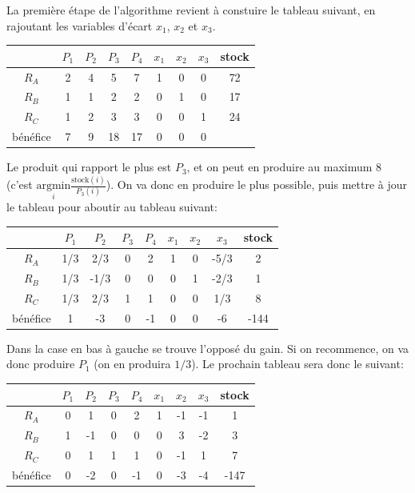       La première étape de l'algorithme revient à constuire le tableau suivant,
      en rajoutant les variables d'écart $x_1$, $x_2$ et $x_3$.

      \begin{center}
        \begin{tabular}{|c|ccccccc|c|}\hline
          & $P_1$ & $P_2$ & $P_3$ & $P_4$ & $x_1$ & $x_2$ & $x_3$ & stock \\ \hline
          $R_A$ & 2 & 4 & 5 & 7 & 1 & 0 & 0 & 72 \\
          $R_B$ & 1 & 1 & 2 & 2 & 0 & 1 & 0 & 17 \\
          $R_C$ & 1 & 2 & 3 & 3 & 0 & 0 & 1 & 24 \\ \hline
          bénéfice & 7 & 9 & 18 & 17 & 0 & 0 & 0 & \\ \hline
        \end{tabular}
      \end{center}

      Le produit qui rapport le plus est $P_3$, et on peut en produire au
      maximum 8 (c'est $\underset{i}{\text{argmin}}
      \frac{\text{stock}(i)}{P_3(i)}$). On va donc en produire le plus
      possible, puis mettre à jour le tableau pour aboutir au tableau suivant:

      \begin{center}
        \begin{tabular}{|c|ccccccc|c|}\hline
          & $P_1$ & $P_2$ & $P_3$ & $P_4$ & $x_1$ & $x_2$ & $x_3$ & stock \\ \hline
          $R_A$ & 1/3 & 2/3 & 0 & 2 & 1 & 0 & -5/3 & 2 \\
          $R_B$ & 1/3 & -1/3 & 0 & 0 & 0 & 1 & -2/3 & 1 \\
          $R_C$ & 1/3 & 2/3 & 1 & 1 & 0 & 0 & 1/3 & 8 \\ \hline
          bénéfice & 1 & -3 & 0 & -1 & 0 & 0 & -6 & -144 \\ \hline
        \end{tabular}
      \end{center}

      Dans la case en bas à gauche se trouve l'opposé du gain. Si on
      recommence, on va donc produire $P_1$ (on en produira $1/3$). Le prochain
      tableau sera donc le suivant:

      \begin{center}
        \begin{tabular}{|c|ccccccc|c|}\hline
          & $P_1$ & $P_2$ & $P_3$ & $P_4$ & $x_1$ & $x_2$ & $x_3$ & stock \\ \hline
          $R_A$ & 0 & 1 & 0 & 2 & 1 & -1 & -1 & 1 \\
          $R_B$ & 1 & -1 & 0 & 0 & 0 & 3 & -2 & 3 \\
          $R_C$ & 0 & 1 & 1 & 1 & 0 & -1 & 1 & 7 \\ \hline
          bénéfice & 0 & -2 & 0 & -1 & 0 & -3 & -4 & -147 \\ \hline
        \end{tabular}
      \end{center}

